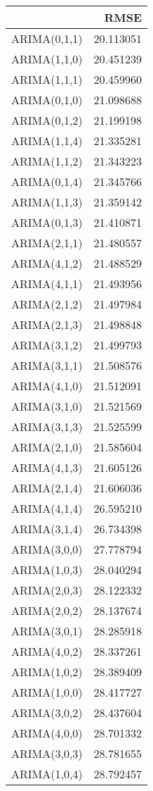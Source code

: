 \begin{tabular}{lr}
\toprule
 & RMSE \\
\midrule
ARIMA(0,1,1) & 20.113051 \\
ARIMA(1,1,0) & 20.451239 \\
ARIMA(1,1,1) & 20.459960 \\
ARIMA(0,1,0) & 21.098688 \\
ARIMA(0,1,2) & 21.199198 \\
ARIMA(1,1,4) & 21.335281 \\
ARIMA(1,1,2) & 21.343223 \\
ARIMA(0,1,4) & 21.345766 \\
ARIMA(1,1,3) & 21.359142 \\
ARIMA(0,1,3) & 21.410871 \\
ARIMA(2,1,1) & 21.480557 \\
ARIMA(4,1,2) & 21.488529 \\
ARIMA(4,1,1) & 21.493956 \\
ARIMA(2,1,2) & 21.497984 \\
ARIMA(2,1,3) & 21.498848 \\
ARIMA(3,1,2) & 21.499793 \\
ARIMA(3,1,1) & 21.508576 \\
ARIMA(4,1,0) & 21.512091 \\
ARIMA(3,1,0) & 21.521569 \\
ARIMA(3,1,3) & 21.525599 \\
ARIMA(2,1,0) & 21.585604 \\
ARIMA(4,1,3) & 21.605126 \\
ARIMA(2,1,4) & 21.606036 \\
ARIMA(4,1,4) & 26.595210 \\
ARIMA(3,1,4) & 26.734398 \\
ARIMA(3,0,0) & 27.778794 \\
ARIMA(1,0,3) & 28.040294 \\
ARIMA(2,0,3) & 28.122332 \\
ARIMA(2,0,2) & 28.137674 \\
ARIMA(3,0,1) & 28.285918 \\
ARIMA(4,0,2) & 28.337261 \\
ARIMA(1,0,2) & 28.389409 \\
ARIMA(1,0,0) & 28.417727 \\
ARIMA(3,0,2) & 28.437604 \\
ARIMA(4,0,0) & 28.701332 \\
ARIMA(3,0,3) & 28.781655 \\
ARIMA(1,0,4) & 28.792457 \\

\end{tabular}
